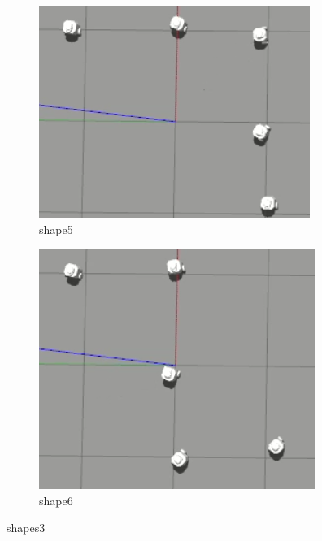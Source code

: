\documentclass[12pt]{extarticle}
\begin{document}
\begin{figure}[H]
\centering
\begin{subfigure}{.5\textwidth}
  \centering
  \includegraphics[width=.8\linewidth]{shape5}
  \caption{shape5}
  \label{fig:sub1}
\end{subfigure}%
\begin{subfigure}{.5\textwidth}
  \centering
  \includegraphics[width=.8\linewidth]{shape6}
  \caption{shape6}
  \label{fig:sub2}
\end{subfigure}
\caption{shapes3}
\label{fig:test}





\end{figure}
\end{document}

